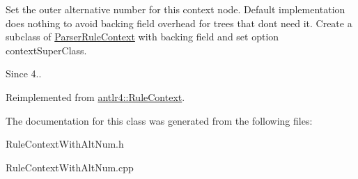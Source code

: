 Set the outer alternative number for this context node. Default implementation does nothing to avoid backing field overhead for trees that don\textquotesingle{}t need it. Create a subclass of \hyperlink{classantlr4_1_1ParserRuleContext}{Parser\+Rule\+Context} with backing field and set option context\+Super\+Class.

\begin{DoxySince}{Since}
4.. 
\end{DoxySince}


Reimplemented from \hyperlink{classantlr4_1_1RuleContext_a13942e9b3fc17ab566e92e6c8c2d88e2}{antlr4\+::\+Rule\+Context}.



The documentation for this class was generated from the following files\+:\begin{DoxyCompactItemize}
\item 
Rule\+Context\+With\+Alt\+Num.\+h\item 
Rule\+Context\+With\+Alt\+Num.\+cpp\end{DoxyCompactItemize}
